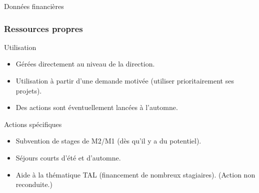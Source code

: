 \documentclass[]{beamer}
\begin{document}

\begin{frame}[label=donnees, standout]{}
  Données financières
\end{frame}


\begin{frame}
    \frametitle{Ressources propres}

  \begin{block}{Utilisation}
    \begin{itemize}
      \item Gérées directement au niveau de la direction.
      \item Utilisation à partir d'une demande motivée (utiliser prioritairement ses projets).
      \item Des actions sont éventuellement lancées à l'automne.
    \end{itemize}
  \end{block}

  \begin{block}{Actions spécifiques}
    \begin{itemize}
      \item Subvention de stages de M2/M1 (dès qu'il y a du potentiel).
      \item Séjours courts d'été et d'automne.
      \item Aide à la thématique TAL (financement de nombreux stagiaires).
      (Action non reconduite.)
    \end{itemize}
  \end{block}

\end{frame}

\end{document}
